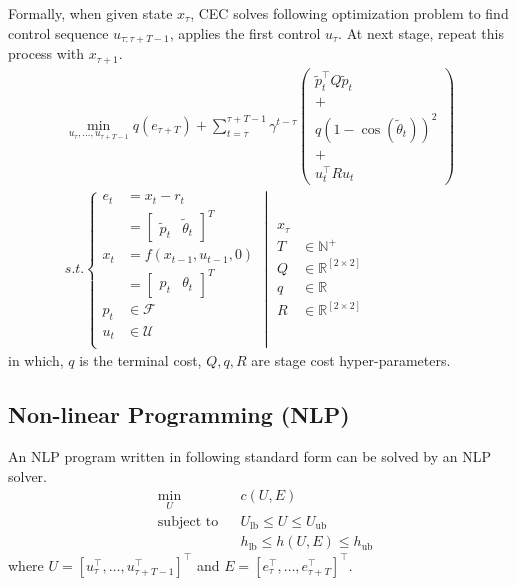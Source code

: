 \documentclass[conference]{IEEEtran}
\begin{document}
Formally, when given state $x_\tau$, 
CEC solves following optimization problem to find control sequence $u_{\tau:\tau+T-1}$, 
applies the first control $u_\tau$. 
At next stage, repeat this process with $x_{\tau+1}$.
\[
\begin{gathered}
\min_{{u}_\tau, \ldots, {u}_{\tau+T-1}} 
q({e}_{\tau+T}) + 
\sum_{t=\tau}^{\tau+T-1} \gamma^{t-\tau} 
\left( 
    \begin{gathered}
        \tilde{p}_t^\top Q \tilde{p}_t  \\ 
        +\\
        q(1 - \cos(\tilde{\theta}_t))^2 \\
        +\\
        {u}_t^\top R {u}_t 
    \end{gathered} 
\right) \\
s.t. \left\{
\begin{aligned}
{e}_{t} 
    &= x_{t} - r_{t} \\
    &= \left[\begin{matrix}\tilde{p}_t&\tilde{\theta}_t\end{matrix}\right]^T \\
x_{t} 
    &= f({x}_{t-1}, {u}_{t-1}, 0) \\
    &= \left[ \begin{matrix}p_{t} & \theta_{t} \end{matrix}  \right]^T \\
{p}_t
    &\in \mathcal{F} \\
{u}_t
    &\in \mathcal{U} \\
\end{aligned}
\middle|
\begin{aligned}
    x_\tau\\
    T &\in \mathbb{N}^+\\
    Q &\in \mathbb{R}^{[2\times 2]} \\
    q &\in \mathbb{R} \\
    R &\in \mathbb{R}^{[2\times 2]}
\end{aligned}
\right.
\end{gathered}
\]
in which, $q$ is the terminal cost, 
$Q,q,R$ are stage cost hyper-parameters.

\subsection{Non-linear Programming (NLP)}
An NLP program written in following standard form can be solved by an NLP solver.
\[
\begin{aligned}
&\min_{{U}} & & c({U}, {E}) \\
&\text{subject to} & & {U}_{\text{lb}} \leq {U} \leq {U}_{\text{ub}} \\
& & & {h}_{\text{lb}} \leq {h}({U}, {E}) \leq {h}_{\text{ub}}
\end{aligned}
\]
where \( {U} = [{u}_\tau^\top, \ldots, {u}_{\tau+T-1}^\top]^\top \) and \( {E} = [{e}_\tau^\top, \ldots, {e}_{\tau+T}^\top]^\top \).
\end{document}
